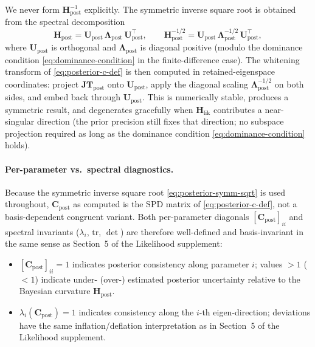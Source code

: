 \documentclass[11pt]{article}
\begin{document}
We never form $\mathbf H_{\mathrm{post}}^{-1}$ explicitly. The symmetric inverse square root is obtained from the spectral decomposition
\begin{equation}
\mathbf H_{\mathrm{post}} = \mathbf U_{\mathrm{post}}\, \boldsymbol\Lambda_{\mathrm{post}}\, \mathbf U_{\mathrm{post}}^\top,
\qquad
\mathbf H_{\mathrm{post}}^{-1/2}
=
\mathbf U_{\mathrm{post}}\,
\boldsymbol\Lambda_{\mathrm{post}}^{-1/2}\,
\mathbf U_{\mathrm{post}}^\top,
\label{eq:posterior-symm-sqrt}
\end{equation}
where $\mathbf U_{\mathrm{post}}$ is orthogonal and $\boldsymbol\Lambda_{\mathrm{post}}$ is diagonal positive (modulo the dominance condition \eqref{eq:dominance-condition} in the finite-difference case). The whitening transform of \eqref{eq:posterior-c-def} is then computed in retained-eigenspace coordinates: project $\mathbf{JT}_{\mathrm{post}}$ onto $\mathbf U_{\mathrm{post}}$, apply the diagonal scaling $\boldsymbol\Lambda_{\mathrm{post}}^{-1/2}$ on both sides, and embed back through $\mathbf U_{\mathrm{post}}$. This is numerically stable, produces a symmetric result, and degenerates gracefully when $\mathbf H_{\mathrm{lik}}$ contributes a near-singular direction (the prior precision still fixes that direction; no subspace projection required as long as the dominance condition \eqref{eq:dominance-condition} holds).

\paragraph{Per-parameter vs.\ spectral diagnostics.}
Because the symmetric inverse square root \eqref{eq:posterior-symm-sqrt} is used throughout, $\mathbf C_{\mathrm{post}}$ as computed is the SPD matrix of \eqref{eq:posterior-c-def}, not a basis-dependent congruent variant. Both per-parameter diagonals $[\mathbf C_{\mathrm{post}}]_{ii}$ and spectral invariants ($\lambda_i$, $\mathrm{tr}$, $\det$) are therefore well-defined and basis-invariant in the same sense as Section~5 of the Likelihood supplement:
\begin{itemize}
\item $[\mathbf C_{\mathrm{post}}]_{ii} = 1$ indicates posterior consistency along parameter $i$; values $>1$ ($<1$) indicate under- (over-) estimated posterior uncertainty relative to the Bayesian curvature $\mathbf H_{\mathrm{post}}$.
\item $\lambda_i(\mathbf C_{\mathrm{post}}) = 1$ indicates consistency along the $i$-th eigen-direction; deviations have the same inflation/deflation interpretation as in Section~5 of the Likelihood supplement.
\end{itemize}
\end{document}
